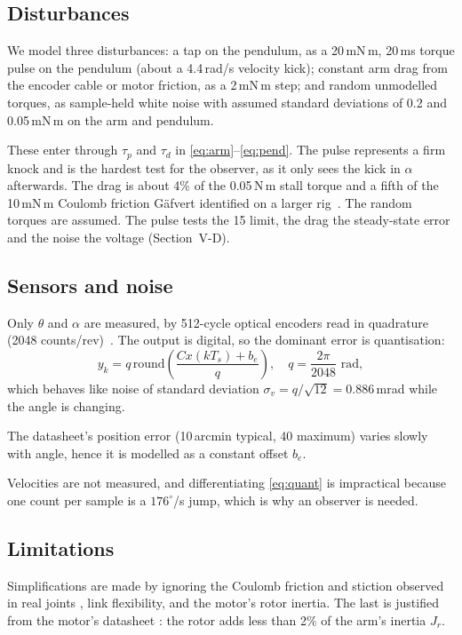 \subsection{Disturbances}
We model three disturbances: a tap on the pendulum, as a 20\,mN\,m, 20\,ms torque pulse on the pendulum (about a 4.4\,rad/s velocity kick); constant arm drag from the encoder cable or motor friction, as a 2\,mN\,m step; and random unmodelled torques, as sample-held white noise with assumed standard deviations of 0.2 and 0.05\,mN\,m on the arm and pendulum.
\begin{rw}
These enter through $\tau_p$ and $\tau_d$ in \eqref{eq:arm}--\eqref{eq:pend}. The pulse represents a firm knock and is the hardest test for the observer, as it only sees the kick in $\alpha$ afterwards. The drag is about 4\% of the 0.05\,N\,m stall torque and a fifth of the 10\,mN\,m Coulomb friction G\"afvert identified on a larger rig~\cite{gafvert1998}. The random torques are assumed. The pulse tests the 15\textdegree{} limit, the drag the steady-state error and the noise the voltage (Section~V-D).
\end{rw}

\subsection{Sensors and noise}
Only $\theta$ and $\alpha$ are measured, by 512-cycle optical encoders read in quadrature (2048 counts/rev)~\cite{heds5540}. The output is digital, so the dominant error is quantisation:
\begin{equation}
y_k = q\,\mathrm{round}\!\left(\frac{Cx(kT_s)+b_e}{q}\right),\quad q=\frac{2\pi}{2048}\text{ rad},\label{eq:quant}
\end{equation}
which behaves like noise of standard deviation $\sigma_v=q/\sqrt{12}=0.886$\,mrad while the angle is changing. \begin{rw}The datasheet's position error (10\,arcmin typical, 40 maximum) varies slowly with angle, hence it is modelled as a constant offset $b_e$.\end{rw} Velocities are not measured, and differentiating \eqref{eq:quant} is impractical because one count per sample is a $176^\circ$/s jump, which is why an observer is needed.

\subsection{Limitations}
Simplifications are made by ignoring the Coulomb friction and stiction observed in real joints \cite{gafvert1998,bellati2021}, link flexibility, and the motor's rotor inertia. The last is justified from the motor's datasheet \cite{allied}: the rotor adds less than 2\% of the arm's inertia $J_r$.


